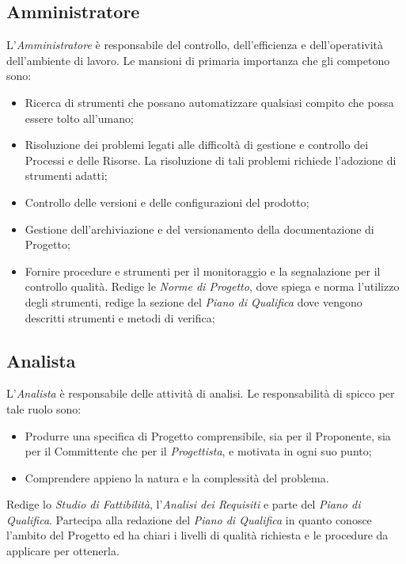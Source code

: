 \subsection{Amministratore}
L’\textit{Amministratore} è responsabile del controllo, dell'efficienza e dell'operatività dell'ambiente di lavoro. Le mansioni di primaria importanza che gli competono sono:
\begin{itemize}

\item Ricerca di strumenti che possano automatizzare qualsiasi compito che possa essere tolto all'umano;
\item Risoluzione dei problemi legati alle difficoltà di gestione e controllo dei Processi e delle Risorse. La risoluzione di tali problemi richiede l'adozione di strumenti adatti;
\item Controllo delle versioni e delle configurazioni del prodotto;
\item Gestione dell'archiviazione e del versionamento della documentazione di Progetto;
\item Fornire procedure e strumenti per il monitoraggio e la segnalazione per il controllo qualità.
Redige le \textit{Norme di Progetto}, dove spiega e norma l'utilizzo degli strumenti, redige la sezione del \textit{Piano di Qualifica} dove vengono descritti strumenti e metodi di verifica;
\end{itemize}

\subsection{Analista}
L’\textit{Analista} è responsabile delle attività di analisi. Le responsabilità di spicco per tale ruolo sono:
\begin{itemize}
\item Produrre una specifica di Progetto comprensibile, sia per il Proponente, sia per il
Committente che per il \textit{Progettista}, e motivata in ogni suo punto;
\item Comprendere appieno la natura e la complessità del problema.
\end{itemize}
Redige lo \textit{Studio di Fattibilità}, l’\textit{Analisi dei Requisiti} e parte del \textit{Piano di Qualifica}.
Partecipa alla redazione del \textit{Piano di Qualifica} in quanto conosce l’ambito del Progetto ed ha chiari i livelli di qualità richiesta e le procedure da applicare per ottenerla.


